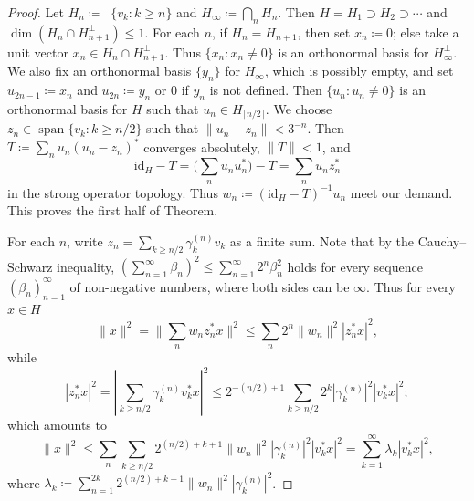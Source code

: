 \documentclass[12pt,nosumlimits,nonamelimits]{amsart}
\newcommand{\id}{\mathrm{id}}
\DeclareMathOperator{\lh}{span}
\DeclareMathOperator{\clh}{\overline{span}}
\begin{document}
\begin{proof}
Let $H_n\coloneqq\clh\{ v_k : k\geq n \}$ and $H_\infty\coloneqq\bigcap_n H_n$. 
Then $H=H_1\supset H_2\supset\cdots$ and 
$\dim(H_n\cap H_{n+1}^\perp)\le1$. 
For each $n$, if $H_n=H_{n+1}$, then set $x_n\coloneqq0$; 
else take a unit vector 
$x_n\in H_n\cap H_{n+1}^\perp$. 
Thus $\{ x_n : x_n\neq0\}$ is an orthonormal 
basis for $H_\infty^\perp$.
We also fix an orthonormal basis $\{ y_n\}$ for $H_\infty$, 
which is possibly empty, and 
set $u_{2n-1} \coloneqq x_n$ and $u_{2n}\coloneqq y_n$ 
or 0 if $y_n$ is not defined. 
Then $\{ u_n : u_n\neq0\}$ is an orthonormal basis 
for $H$ such that $u_n\in H_{\lceil n/2\rceil}$. 
We choose $z_n\in\lh\{ v_k : k\geq n/2\}$ such that 
$\| u_n - z_n \| < 3^{-n}$. 
Then $T\coloneqq\sum_n u_n (u_n-z_n)^*$ converges absolutely, 
$\|T\|<1$, and 
$$\id_H-T=\bigl(\sum_n u_nu_n^*\bigr)-T = \sum_n u_nz_n^*$$ 
in the strong operator topology. 
Thus $w_n\coloneqq(\id_H-T)^{-1}u_n$ meet our demand. 
This proves the first half of Theorem.

For each $n$, 
write $z_n = \sum_{k\geq n/2} \gamma^{(n)}_k v_k$ 
as a finite sum. 
Note that by the Cauchy--Schwarz inequality, 
$(\sum_{n=1}^\infty \beta_n)^2\le \sum_{n=1}^\infty 2^n\beta_n^2$ 
holds for every sequence $(\beta_n)_{n=1}^\infty$ 
of non-negative numbers, where 
both sides can be $\infty$. 
Thus for every $x\in H$ 
\[
\|x\|^2 = \|\sum_n w_n z_n^*x\|^2 
\le\sum_n 2^n\|w_n\|^2|z_n^*x|^2,
\]
while 
\[
|z_n^*x|^2=|\sum_{k\geq n/2}\gamma^{(n)}_k v_k^*x |^2
\le 2^{-(n/2)+1}\sum_{k\geq n/2} 2^k|\gamma^{(n)}_k|^2 |v_k^*x |^2;
\]
which amounts to 
\[
\|x\|^2 \le \sum_n\sum_{k\geq n/2}2^{(n/2)+k+1}\|w_n\|^2|\gamma^{(n)}_k|^2 |v_k^*x |^2
=\sum_{k=1}^\infty\lambda_k |v_k^*x |^2,
\]
where $\lambda_k\coloneqq\sum_{n=1}^{2k}2^{(n/2)+k+1}\|w_n\|^2|\gamma^{(n)}_k|^2$.
\end{proof}
%

%
\end{document}
